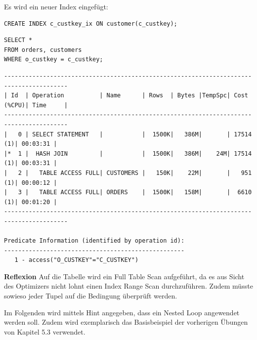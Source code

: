 \documentclass[10pt]{article}
\begin{document}
\newpage
Es wird ein neuer Index eingefügt:
\begin{lstlisting}[style=sql]
CREATE INDEX c_custkey_ix ON customer(c_custkey);
\end{lstlisting}
\begin{lstlisting}[style=sql]
SELECT *
FROM orders, customers
WHERE o_custkey = c_custkey;
\end{lstlisting}
\begin{lstlisting}[style=queryexecutionplan]
----------------------------------------------------------------------------------------
| Id  | Operation          | Name      | Rows  | Bytes |TempSpc| Cost (%CPU)| Time     |
----------------------------------------------------------------------------------------
|   0 | SELECT STATEMENT   |           |  1500K|   386M|       | 17514   (1)| 00:03:31 |
|*  1 |  HASH JOIN         |           |  1500K|   386M|    24M| 17514   (1)| 00:03:31 |
|   2 |   TABLE ACCESS FULL| CUSTOMERS |   150K|    22M|       |   951   (1)| 00:00:12 |
|   3 |   TABLE ACCESS FULL| ORDERS    |  1500K|   158M|       |  6610   (1)| 00:01:20 |
----------------------------------------------------------------------------------------
 
Predicate Information (identified by operation id):
---------------------------------------------------
   1 - access("O_CUSTKEY"="C_CUSTKEY")
\end{lstlisting}
\textbf{Reflexion} \newline
Auf die Tabelle wird ein Full Table Scan aufgeführt, da es aus Sicht des Optimizers nicht 
lohnt einen Index Range Scan durchzuführen. Zudem müsste sowieso jeder Tupel auf die Bedingung 
überprüft werden. 

Im Folgenden wird mittels Hint angegeben, dass ein Nested Loop angewendet werden soll.\newline
Zudem wird exemplarisch das Basisbeispiel der vorherigen Übungen von Kapitel 5.3 verwendet.\newline
\end{document}
